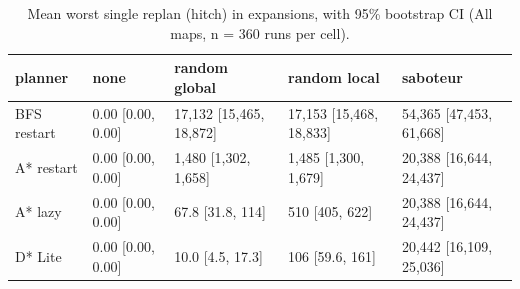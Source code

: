 \begin{table}[t]
\centering
\small
\caption{Mean worst single replan (hitch) in expansions, with 95\% bootstrap CI (All maps, n = 360 runs per cell).}
\label{tab:hitch-all}
\begin{tabular}{lllll}
\toprule
planner & none & random global & random local & saboteur \\
\midrule
BFS restart & 0.00 [0.00, 0.00] & 17,132 [15,465, 18,872] & 17,153 [15,468, 18,833] & 54,365 [47,453, 61,668] \\
A* restart & 0.00 [0.00, 0.00] & 1,480 [1,302, 1,658] & 1,485 [1,300, 1,679] & 20,388 [16,644, 24,437] \\
A* lazy & 0.00 [0.00, 0.00] & 67.8 [31.8, 114] & 510 [405, 622] & 20,388 [16,644, 24,437] \\
D* Lite & 0.00 [0.00, 0.00] & 10.0 [4.5, 17.3] & 106 [59.6, 161] & 20,442 [16,109, 25,036] \\
\bottomrule
\end{tabular}
\end{table}
